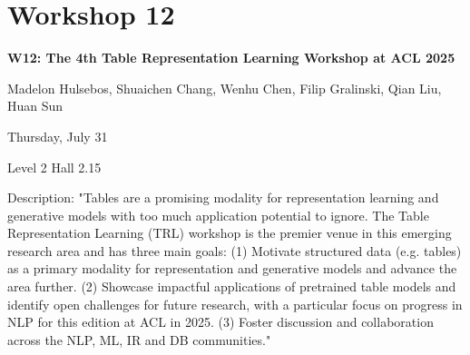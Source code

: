 \clearpage



\section[W12: The 4th Table Representation Learning Workshop at ACL 2025]{Workshop 12}

\begin{center}
    {\Large \textbf{W12: The 4th Table Representation Learning Workshop at ACL 2025}}

   Madelon Hulsebos, Shuaichen Chang, Wenhu Chen, Filip Gralinski, Qian Liu, Huan Sun

    Thursday, July 31
    
   Level 2 Hall 2.15

\end{center}

Description: "Tables are a promising modality for representation learning and generative models with too much application potential to ignore. The Table Representation Learning (TRL) workshop is the premier venue in this emerging research area and has three main goals:
(1) Motivate structured data (e.g. tables) as a primary modality for representation and generative models and advance the area further.
(2) Showcase impactful applications of pretrained table models and identify open challenges for future research, with a particular focus on progress in NLP for this edition at ACL in 2025.
(3) Foster discussion and collaboration across the NLP, ML, IR and DB communities."


